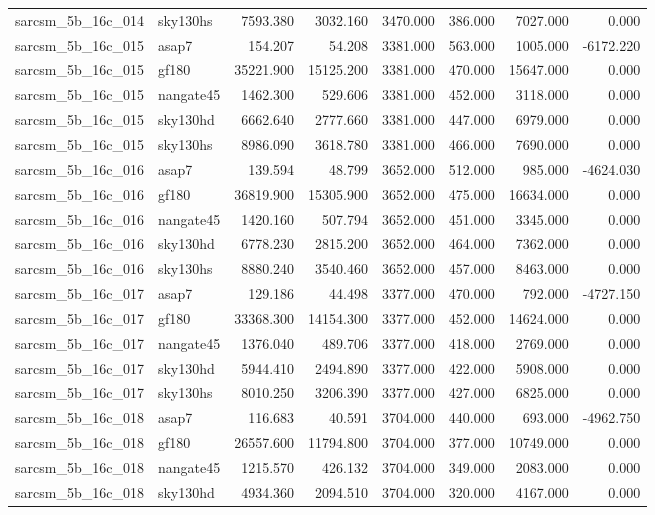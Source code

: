 \begin{tabular}{llrrrrrr}
sarcsm\_5b\_16c\_014 & sky130hs & 7593.380 & 3032.160 & 3470.000 & 386.000 & 7027.000 & 0.000 \\
sarcsm\_5b\_16c\_015 & asap7 & 154.207 & 54.208 & 3381.000 & 563.000 & 1005.000 & -6172.220 \\
sarcsm\_5b\_16c\_015 & gf180 & 35221.900 & 15125.200 & 3381.000 & 470.000 & 15647.000 & 0.000 \\
sarcsm\_5b\_16c\_015 & nangate45 & 1462.300 & 529.606 & 3381.000 & 452.000 & 3118.000 & 0.000 \\
sarcsm\_5b\_16c\_015 & sky130hd & 6662.640 & 2777.660 & 3381.000 & 447.000 & 6979.000 & 0.000 \\
sarcsm\_5b\_16c\_015 & sky130hs & 8986.090 & 3618.780 & 3381.000 & 466.000 & 7690.000 & 0.000 \\
sarcsm\_5b\_16c\_016 & asap7 & 139.594 & 48.799 & 3652.000 & 512.000 & 985.000 & -4624.030 \\
sarcsm\_5b\_16c\_016 & gf180 & 36819.900 & 15305.900 & 3652.000 & 475.000 & 16634.000 & 0.000 \\
sarcsm\_5b\_16c\_016 & nangate45 & 1420.160 & 507.794 & 3652.000 & 451.000 & 3345.000 & 0.000 \\
sarcsm\_5b\_16c\_016 & sky130hd & 6778.230 & 2815.200 & 3652.000 & 464.000 & 7362.000 & 0.000 \\
sarcsm\_5b\_16c\_016 & sky130hs & 8880.240 & 3540.460 & 3652.000 & 457.000 & 8463.000 & 0.000 \\
sarcsm\_5b\_16c\_017 & asap7 & 129.186 & 44.498 & 3377.000 & 470.000 & 792.000 & -4727.150 \\
sarcsm\_5b\_16c\_017 & gf180 & 33368.300 & 14154.300 & 3377.000 & 452.000 & 14624.000 & 0.000 \\
sarcsm\_5b\_16c\_017 & nangate45 & 1376.040 & 489.706 & 3377.000 & 418.000 & 2769.000 & 0.000 \\
sarcsm\_5b\_16c\_017 & sky130hd & 5944.410 & 2494.890 & 3377.000 & 422.000 & 5908.000 & 0.000 \\
sarcsm\_5b\_16c\_017 & sky130hs & 8010.250 & 3206.390 & 3377.000 & 427.000 & 6825.000 & 0.000 \\
sarcsm\_5b\_16c\_018 & asap7 & 116.683 & 40.591 & 3704.000 & 440.000 & 693.000 & -4962.750 \\
sarcsm\_5b\_16c\_018 & gf180 & 26557.600 & 11794.800 & 3704.000 & 377.000 & 10749.000 & 0.000 \\
sarcsm\_5b\_16c\_018 & nangate45 & 1215.570 & 426.132 & 3704.000 & 349.000 & 2083.000 & 0.000 \\
sarcsm\_5b\_16c\_018 & sky130hd & 4934.360 & 2094.510 & 3704.000 & 320.000 & 4167.000 & 0.000 \\

\end{tabular}
